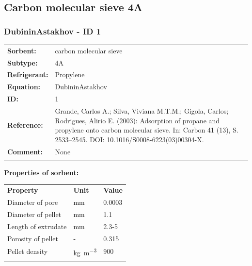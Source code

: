 \subsection{Carbon molecular sieve 4A}
%
\subsubsection{DubininAstakhov - ID 1}
%
\begin{tabular}[l]{|lp{11.5cm}|}
\hline
\addlinespace

\textbf{Sorbent:} & carbon molecular sieve \\
\textbf{Subtype:} & 4A \\
\textbf{Refrigerant:} & Propylene \\
\textbf{Equation:} & DubininAstakhov \\
\textbf{ID:} & 1 \\
\textbf{Reference:} & Grande, Carlos A.; Silva, Viviana M.T.M.; Gigola, Carlos; Rodrigues, Alirio E. (2003): Adsorption of propane and propylene onto carbon molecular sieve. In: Carbon 41 (13), S. 2533–2545. DOI: 10.1016/S0008-6223(03)00304-X. \\
\textbf{Comment:} & None \\

\addlinespace
\hline
\end{tabular}
\newline

\textbf{Properties of sorbent:}
\newline
%
\begin{longtable}[l]{lll}
\toprule
\addlinespace
\textbf{Property} & \textbf{Unit} & \textbf{Value} \\
\addlinespace
\midrule
\endhead
\bottomrule
\endfoot
\bottomrule
\endlastfoot
\addlinespace

Diameter of pore & \si{\milli\meter} & 0.0003\\
Diameter of pellet & \si{\milli\meter} & 1.1\\
Length of extrudate & \si{\milli\meter} & 2.3-5\\
Porosity of pellet & - & 0.315\\
Pellet density & \si{\kilogram\per\cubic\meter} & 900\\

\addlinespace\end{longtable}

